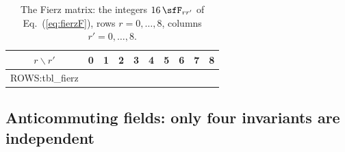 \begin{table}
\caption{\label{tab:fierz}The Fierz matrix: the integers $16\,\sfF_{rr'}$ of Eq.~(\ref{eq:fierzF}),
rows $r=0,\dots,8$, columns $r'=0,\dots,8$.}
\begin{ruledtabular}
\begin{tabular}{c|rrrrrrrrr}
$r\backslash r'$ & 0 & 1 & 2 & 3 & 4 & 5 & 6 & 7 & 8 \\
\hline
{{ROWS:tbl_fierz}}
\end{tabular}
\end{ruledtabular}
\end{table}

\subsection{Anticommuting fields: only four invariants are independent}
\label{sec:four}

